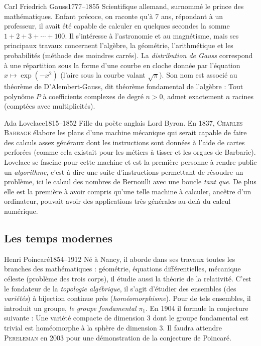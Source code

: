 \documentclass[10pt,class=article,crop=false]{standalone}
\begin{document}
\begin{multicols}{2}
\begin{biographie}{Carl Friedrich Gauss}{1777--1855}
Scientifique allemand, surnommé le \og{}prince des mathématiques\fg{}.
Enfant précoce, on raconte qu'à 7 ans, répondant à un professeur, il avait été capable de calculer en quelques secondes la somme $1+2+3+\cdots+100$. 
Il s'intéresse à l'astronomie et au magnétisme, mais ses principaux travaux concernent l'algèbre, la géométrie, l'arithmétique et les probabilités (méthode des moindres carrés). La \emph{distribution de Gauss} correspond à une répartition sous la forme d'une \og{}courbe en cloche\fg{} donnée par l'équation $x \mapsto \exp(-x^2)$ (l'aire sous la courbe valant $\sqrt\pi$).
Son nom est associé au théorème de D'Alembert-Gauss, dit théorème fondamental de l'algèbre : \og{}Tout polynôme $P$ à coefficients complexes de degré $n>0$, admet exactement $n$ racines (comptées avec multiplicités).\fg{}
\end{biographie}	


\begin{biographie}{Ada Lovelace}{1815--1852}
Fille du poète anglais Lord Byron. En 1837, \textsc{Charles Babbage} élabore les plans d'une machine mécanique qui serait capable de faire des calculs assez généraux dont les instructions sont données à l'aide de cartes perforées (comme cela existait pour les métiers à tisser et les orgues de Barbarie). Lovelace se fascine pour cette machine et est la première personne à rendre public un \emph{algorithme}, c'est-à-dire une suite d'instructions permettant de résoudre un problème, ici le calcul des nombres de Bernoulli avec une boucle \emph{tant que}. De plus elle est la première à avoir compris qu'une telle machine à calculer, ancêtre d'un ordinateur, pouvait avoir des applications très générales au-delà du calcul numérique. 
\end{biographie}


\subsection{Les temps modernes}


\begin{biographie}{Henri Poincaré}{1854--1912}
Né à Nancy, il aborde dans ses travaux toutes les branches des mathématiques : géométrie, équations différentielles, mécanique céleste (problème des trois corps), il étudie aussi la théorie de la relativité.
C'est le fondateur de la \emph{topologie algébrique}, il s'agit d'étudier des ensembles (des \emph{variétés}) à bijection continue près (\emph{homéomorphisme}). Pour de tels ensembles, il introduit un groupe, \emph{le groupe fondamental} $\pi_1$. En 1904 il formule la conjecture suivante : \og{}Une variété compacte de dimension 3 dont le groupe fondamental est trivial est homéomorphe à la sphère de dimension 3.\fg{} Il faudra attendre \textsc{Pereleman} en 2003 pour une démonstration de la conjecture de Poincaré.
\end{biographie}



\end{multicols}
\end{document}

